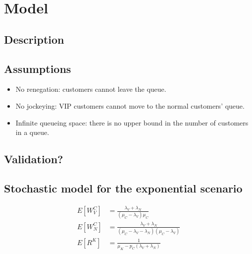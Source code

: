 \section{Model}

\subsection{Description}

\subsection{Assumptions}
\begin{itemize}
    \item No renegation: customers cannot leave the queue.
    \item No jockeying: VIP customers cannot move to the normal customers' queue.
    \item Infinite queueing space: there is no upper bound in the number of 
        customers in a queue.
\end{itemize}

\subsection{Validation?}

\subsection{Stochastic model for the exponential scenario}
\begin{align}
    E[W^C_{V}] &= \frac{\lambda_V + \lambda_N}{(\mu_C-\lambda_{V})\mu_C} \\
    E[W^C_{N}] &= \frac{\lambda_V + \lambda_N}{(\mu_C-\lambda_{V}-\lambda_N)(\mu_C-\lambda_{V})} \\
    E[R^K] &= \frac{1}{\mu_K-p_C(\lambda_{V}+\lambda_{N})}
\end{align}